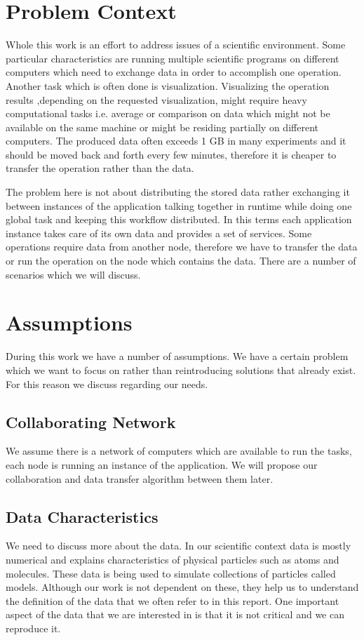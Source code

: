 \section{Problem Context}
Whole this work is an effort to address issues of a scientific environment. Some particular characteristics
are running multiple scientific programs on different computers which need to exchange data in order to
accomplish one operation. Another task which is often done is visualization. Visualizing the operation results
,depending on the requested visualization, might require heavy computational tasks i.e. average or comparison
on data which might not be available on the same machine or might be residing partially on different computers.
The produced data often exceeds 1 GB in many experiments and it should be moved back and forth every few minutes,
therefore it is cheaper to transfer the operation rather than the data.

The problem here is not about distributing the stored data rather exchanging it between instances of the application 
talking together in runtime while doing one global task and keeping this workflow distributed. In this terms each
application instance takes care of its own data and provides a set of services. Some operations require data from
another node, therefore we have to transfer the data or run the operation on the node which contains the data. There
are a number of scenarios which we will discuss.

\section{Assumptions}
During this work we have a number of assumptions. We have a certain problem which we want to focus
on rather than reintroducing solutions that already exist. For this reason we discuss regarding our 
needs.

\subsection{Collaborating Network}
We assume there is a network of computers which are available to run the tasks, each node is running an instance
of the application. We will propose our collaboration and data transfer algorithm between them later.

\subsection{Data Characteristics}
We need to discuss more about the data. In our scientific context data is mostly numerical and explains characteristics
of physical particles such as atoms and molecules. These data is being used to simulate collections of particles called
models. Although our work is not dependent on these, they help us to understand the definition of the data that
we often refer to in this report. One important aspect of the data that we are interested in is that it is not critical 
and we can reproduce it. 


